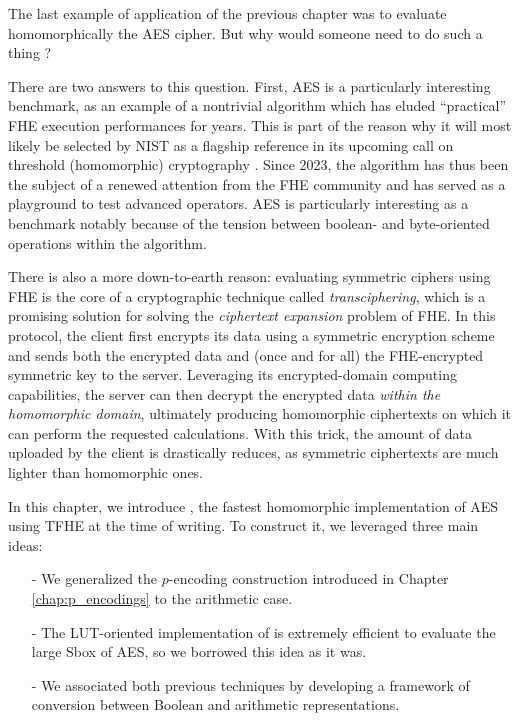 The last example of application of the previous chapter was to evaluate homomorphically the AES cipher. But why would someone need to do such a thing ?

There are two answers to this question. First,  AES is a particularly interesting benchmark, as an example of a nontrivial algorithm which has eluded ``practical'' FHE execution performances for years. This is part of the reason why it will most likely be selected by NIST as a flagship reference in its upcoming call on threshold (homomorphic) cryptography \cite{call_nist}. Since 2023, the algorithm has thus been the subject of a renewed attention from the FHE community and has served as a playground to test advanced operators\cite{DBLP:conf/wahc/TramaCBS23, ISC:WWLLL23, TCHES:BonPoiRiv24, TCHES:WLWLLW24}. AES is particularly interesting as a benchmark notably because of the tension between boolean- and byte-oriented operations within the algorithm.


There is also a more down-to-earth reason: evaluating symmetric ciphers using FHE is the core of a cryptographic technique called \textit{transciphering}, which is a promising solution for solving the \textit{ciphertext expansion} problem of FHE. In this protocol, the client first encrypts its data using a symmetric encryption scheme and sends both the encrypted data and (once and for all) the FHE-encrypted symmetric key to the server. Leveraging its encrypted-domain computing capabilities, the server can then decrypt the encrypted data \emph{within the homomorphic domain}, ultimately producing homomorphic ciphertexts on which it can perform the requested calculations. With this trick, the amount of data uploaded by the client is drastically reduces, as symmetric ciphertexts are much lighter than homomorphic ones.


In this chapter, we introduce \hippo, the fastest homomorphic implementation of AES using TFHE at the time of writing. To construct it, we leveraged three main ideas:

\begin{itemize}
	\item[-] We generalized the $p$-encoding construction introduced in Chapter \ref{chap:p_encodings} to the arithmetic case.
	\item[-] The LUT-oriented implementation of \cite{DBLP:conf/wahc/TramaCBS23} is extremely efficient to evaluate the large Sbox of AES, so we borrowed this idea as it was.
	\item[-] We associated both previous techniques by developing a framework of conversion between Boolean and arithmetic representations.
\end{itemize}


